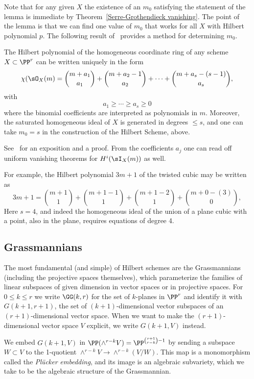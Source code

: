 Note that  for any given $X$ the existence of an $m_0$ satisfying the statement of the lemma is immediate by  Theorem~\ref{Serre-Grothendieck vanishing}. The point of the lemma is that we can find one value of $m_0$ that works for all $X$ with Hilbert polynomial $p$. The following result of~\cite{Gotzmann} provides a method for determining $m_0$. 

\begin{theorem}
The Hilbert polynomial  of the homogeneous coordinate ring of any scheme $X\subset \PP^r$ can be written uniquely in the form
$$
\chi(\sO_X(m) = {m+a_1\choose a_1}+ {m+a_2 -1\choose a_2}+ \cdots+{m+a_s -(s-1)\choose a_s},
$$
with 
$$
a_1\geq \cdots \geq a_s \geq 0
$$
where the binomial coefficients are interpreted as polynomials in $m$. Moreover, the saturated homogeneous ideal of $X$ is
 generated in degrees $\leq s$, and one can take $m_0 = s$ in the construction of the Hilbert Scheme, above.
\end{theorem}

See~\cite{MR1023391} %
for an exposition and a proof. From the coefficients $a_j$ one can read off uniform vanishing theorems for $H^i(\sI_X(m))$
 as well.
 
 For example, the Hilbert polynomial $3m+1$ of the twisted cubic may be written as
 $$
 3m+1 =  {m+1\choose 1}+ {m+1 -1\choose 1}+{m+1 -2\choose 1}+{m+0 -(3)\choose 0},
 $$
 Here $s=4$, and indeed the homogeneous ideal of the union of a plane cubic with a point, also in the plane,
 requires equations of degree 4.
 
 \subsection{Grassmannians}\label{Grassmannian section}
 
 The most fundamental (and simple) of Hilbert schemes are the Grassmannians (including the projective spaces themselves), which parameterize the families of linear subspaces of given dimension in vector spaces or in projective spaces.
For $0\leq k\leq r$ we write $\GG(k,r)$ for the set of $k$-planes in $\PP^{r}$ and identify it with
$G(k+1,r+1)$, the set of $(k+1)$-dimensional vector subspaces of an $(r+1)$-dimensional vector space.
When we want to make the $(r+1)$-dimensional vector space $V$ explicit, we write $G(k+1, V)$ instead.

We embed $G(k+1,V)$ in $\PP(\wedge^{r-k}V) = \PP^{\binom{r+1}{r-k}-1}$ by sending a subspace $W\subset V$ to the 1-quotient $\wedge^{r-k}V \to \wedge^{r-k}(V/W)$. This map is a monomorphism called the \emph{Pl\"ucker embedding}, and its image is an algebraic subvariety, which we take to be the algebraic structure
of the Grassmannian. 


